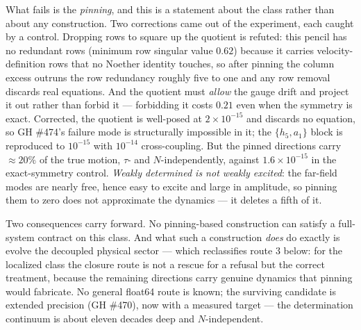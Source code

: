 What fails is the \emph{pinning}, and this is a statement about the class
rather than about any construction. Two corrections came out of the
experiment, each caught by a control. Dropping rows to square up the
quotient is refuted: this pencil has no redundant rows (minimum row
singular value $0.62$) because it carries velocity-definition rows that no
Noether identity touches, so after pinning the column excess outruns the
row redundancy roughly five to one and any row removal discards real
equations. And the quotient must \emph{allow} the gauge drift and project
it out rather than forbid it --- forbidding it costs $0.21$ even when the
symmetry is exact. Corrected, the quotient is well-posed at $2\times
10^{-15}$ and discards no equation, so GH \#474's failure mode is
structurally impossible in it; the $\{h_5,a_1\}$ block is reproduced to
$10^{-15}$ with $10^{-14}$ cross-coupling. But the pinned directions carry
$\approx\!20\%$ of the true motion, $\tau$- and $N$-independently, against
$1.6\times10^{-15}$ in the exact-symmetry control. \emph{Weakly determined
is not weakly excited}: the far-field modes are nearly free, hence easy to
excite and large in amplitude, so pinning them to zero does not approximate
the dynamics --- it deletes a fifth of it.

Two consequences carry forward. No pinning-based construction can satisfy
a full-system contract on this class. And what such a construction
\emph{does} do exactly is evolve the decoupled physical sector --- which
reclassifies route 3 below: for the localized class the closure route is
not a rescue for a refusal but the correct treatment, because the
remaining directions carry genuine dynamics that pinning would fabricate.
No general float64 route is known; the surviving candidate is extended
precision (GH \#470), now with a measured target --- the determination
continuum is about eleven decades deep and $N$-independent.

